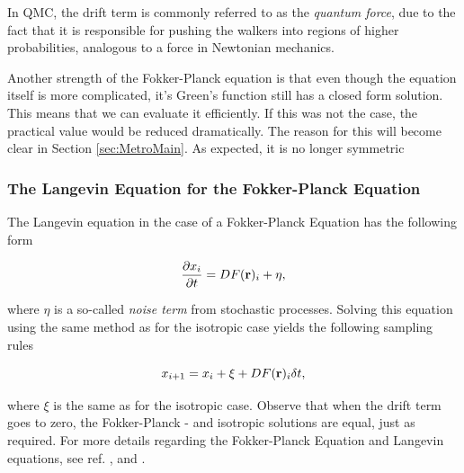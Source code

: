 

In QMC, the drift term is commonly referred to as the \textit{quantum force}, due to the fact that it is responsible for pushing the walkers into regions of higher probabilities, analogous to a force in Newtonian mechanics.

Another strength of the Fokker-Planck equation is that even though the equation itself is more complicated, it's Green's function still has a closed form solution. This means that we can evaluate it efficiently. If this was not the case, the practical value would be reduced dramatically. The reason for this will become clear in Section \ref{sec:MetroMain}. As expected, it is no longer symmetric 


\subsubsection{The Langevin Equation for the Fokker-Planck Equation}

The Langevin equation in the case of a Fokker-Planck Equation has the following form

\begin{equation}
 \frac{\partial x_i}{\partial t} = D F(\mathbf{r})_i + \eta,
\end{equation}

where $\eta$ is a so-called \textit{noise term} from stochastic processes. Solving this equation using the same method as for the isotropic case yields the following sampling rules

\begin{equation}
 \label{eq:langevinSolFP}
 x_{i+1} = x_i + \xi + DF(\mathbf{r})_i\delta t,
\end{equation}

where $\xi$ is the same as for the isotropic case. Observe that when the drift term goes to zero, the Fokker-Planck - and isotropic solutions are equal, just as required. For more details regarding the Fokker-Planck Equation and Langevin equations, see ref. \cite{Gardiner:2004bk}, \cite{risken1989fpe} and \cite{langevin}.


